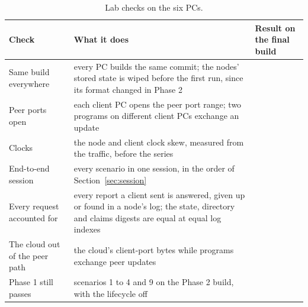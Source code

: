 \begin{table}[!htb]
\centering\small
\caption{Lab checks on the six PCs.}
\label{tab:labtests}
\begin{tabularx}{\linewidth}{@{}P{3.4cm}LP{3.2cm}@{}}
\toprule
Check & What it does & Result on the final build \\
\midrule
Same build everywhere & every PC builds the same commit; the nodes' stored state is wiped before the first run, since its format changed in Phase 2 & \tbd{} \\
Peer ports open & each client PC opens the peer port range; two programs on different client PCs exchange an update & \tbd{} \\
Clocks & the node and client clock skew, measured from the traffic, before the series & \tbd{} \\
End-to-end session & every scenario in one session, in the order of Section~\ref{sec:session} & \tbd{} \\
Every request accounted for & every report a client sent is answered, given up or found in a node's log; the state, directory and claims digests are equal at equal log indexes & \tbd{} \\
The cloud out of the peer path & the cloud's client-port bytes while programs exchange peer updates & \tbd{} \\
Phase 1 still passes & scenarios 1 to 4 and 9 on the Phase 2 build, with the lifecycle off & \tbd{} \\
\bottomrule
\end{tabularx}
\end{table}

